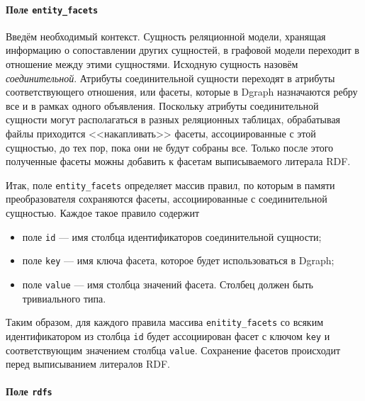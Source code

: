 \paragraph{Поле \texttt{entity\_facets}}

Введём необходимый контекст. Сущность реляционной модели, хранящая информацию о сопоставлении других сущностей,
в графовой модели переходит в отношение между этими сущностями. Исходную сущность назовём \textit{соединительной}.
Атрибуты соединительной сущности переходят в атрибуты соответствующего отношения, или фасеты,
которые в Dgraph назначаются ребру все и в рамках одного объявления. Поскольку атрибуты соединительной сущности
могут располагаться в разных реляционных таблицах, обрабатывая файлы приходится <<накапливать>>
фасеты, ассоциированные с этой сущностью, до тех пор, пока они не будут собраны все. Только после
этого полученные фасеты можны добавить к фасетам выписываемого литерала RDF.

Итак, поле \texttt{entity\_facets} определяет массив правил, по которым в памяти преобразователя
сохраняются фасеты, ассоциированные с соединительной сущностью. Каждое такое правило содержит
\begin{itemize}
    \item поле \texttt{id} --- имя столбца идентификаторов соединительной сущности;
    \item поле \texttt{key} --- имя ключа фасета, которое будет использоваться в Dgraph;
    \item поле \texttt{value} --- имя столбца значений фасета. Столбец должен быть тривиального типа.
\end{itemize}

Таким образом, для каждого правила массива \texttt{enitity\_facets} со всяким идентификатором из
столбца \texttt{id} будет ассоциирован фасет с ключом \texttt{key} и соответствующим значением
столбца \texttt{value}. Сохранение фасетов происходит перед выписыванием литералов RDF.

\paragraph{Поле \texttt{rdfs}}

